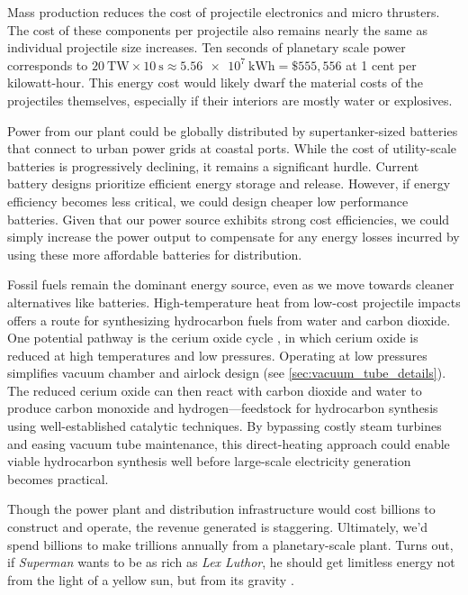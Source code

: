 \documentclass{article}
\begin{document}
Mass production reduces the cost of projectile electronics and micro thrusters. The cost of these components per projectile also remains nearly the same as individual projectile size increases.  Ten seconds of planetary scale power corresponds to $\SI{20}{\tera\watt} \times \SI{10}{\second} \approx \SI{5.56e7}{\kilo\watt\hour} = \$555,556$ at 1 cent per kilowatt-hour.  This energy cost would likely dwarf the material costs of the projectiles themselves, especially if their interiors are mostly water or explosives.      

Power from our plant could be globally distributed by supertanker-sized batteries that connect to urban power grids at coastal ports.  While the cost of utility-scale batteries is progressively declining, it remains a significant hurdle. Current battery designs prioritize efficient energy storage and release. However, if energy efficiency becomes less critical, we could design cheaper low performance batteries. Given that our power source exhibits strong cost efficiencies, we could simply increase the power output to compensate for any energy losses incurred by using these more affordable batteries for distribution. 

Fossil fuels remain the dominant energy source, even as we move towards cleaner alternatives like batteries. High-temperature heat from low-cost projectile impacts offers a route for synthesizing hydrocarbon fuels from water and carbon dioxide. One potential pathway is the cerium oxide cycle \cite{CeriaThermoCycles}, in which cerium oxide is reduced at high temperatures and low pressures. Operating at low pressures simplifies vacuum chamber and airlock design (see \autoref{sec:vacuum_tube_details}). The reduced cerium oxide can then react with carbon dioxide and water to produce carbon monoxide and hydrogen—feedstock for hydrocarbon synthesis using well-established catalytic techniques. By bypassing costly steam turbines and easing vacuum tube maintenance, this direct-heating approach could enable viable hydrocarbon synthesis well before large-scale electricity generation becomes practical.

Though the power plant and distribution infrastructure would cost billions to construct and operate, the revenue generated is staggering. Ultimately, we'd spend billions to make trillions annually from a planetary-scale plant.  Turns out, if  \textit{Superman} wants to be as rich as \textit{Lex Luthor}, he should get limitless energy not from the light of a yellow sun, but from its gravity \cite{superman2025}.
\end{document}
